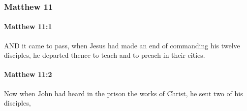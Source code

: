 	\subsubsection{Matthew 11} %
		\label{MATTHEW-11}
		
		\paragraph{Matthew 11:1} %
			\label{MATTHEW-11-1}

			AND it came to pass, when Jesus had made an end of commanding his twelve disciples, he departed thence to teach and to preach in their cities.

			\begin{framed}
			\scriptsize
				\begin{compactdesc}
					\item[SBLG] 
				\end{compactdesc}
			\end{framed}

		\paragraph{Matthew 11:2} %
			\label{MATTHEW-11-2}

			Now when John had heard in the prison the works of Christ, he sent two of his disciples,

